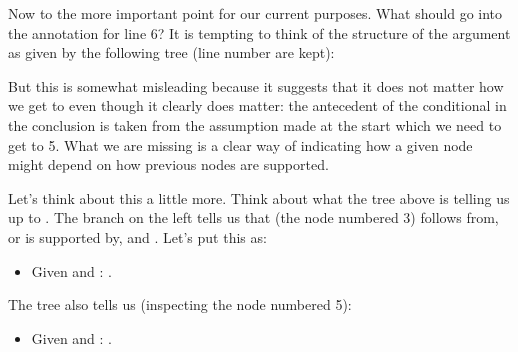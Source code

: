 Now to the more important point for our current purposes. What should go into 
the annotation for line 6? It is tempting to think of the structure of the 
argument as given by the following tree (line number are kept):


\begin{center}
\end{center}

But this is somewhat misleading because it suggests that it does not matter how 
we get to  even though it clearly does 
matter: the antecedent of the conditional in the conclusion is taken from the 
assumption made at the start which we need to get to 5.  What we are missing is 
a clear way of indicating how a given node might depend on how previous nodes 
are supported. 

Let's think about this a little more. Think about what the tree above is telling 
us up to . The branch on the left tells 
us that  (the node numbered 3) follows from, or is 
supported  by,
 and .
  Let's put this as:

\begin{itemize}

 \item Given  and : .

\end{itemize}

The tree also tells us (inspecting the node numbered 5):

\begin{itemize}

 \item Given  and : .

\end{itemize}

